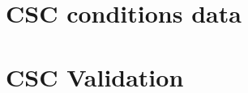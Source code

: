 \section{CSC conditions data} \label{sec:CSCConditionsData}


\section{CSC Validation} \label{sec:CSCValidation}
